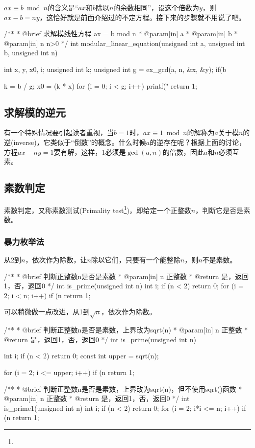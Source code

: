 $ax \equiv b\bmod n$的含义是“$ax$和$b$除以$n$的余数相同”，设这个倍数为$y$，则$ax-b=ny$，这恰好就是前面介绍过的不定方程。接下来的步骤就不用说了吧。

\begin{Code}
/**
 * @brief 求解模线性方程 ax = b mod n
 * @param[in] a
 * @param[in] b
 * @param[in] n n>0
 */
int modular_linear_equation(unsigned int a, unsigned int b, unsigned int n) {
    int x, y, x0, i;
    unsigned int k;
    unsigned int g = ex_gcd(a, n, &x, &y);
    if(b %

    k = b / g;
    x0 = (k * x) %
    for (i = 0; i < g; i++)
        printf("%
    return 1;
}
\end{Code}


\subsection{求解模的逆元}
有一个特殊情况要引起读者重视，当$b=1$时，$ax \equiv 1\bmod n$的解称为$a$关于模$n$的逆(inverse)，它类似于“倒数”的概念。什么时候$a$的逆存在呢？根据上面的讨论，方程$ax-ny=1$要有解，这样，1必须是$\gcd(a,n)$的倍数，因此$a$和$n$必须互素。

\subsection{素数判定}
素数判定，又称素数测试(Primality test\footnote{})，即给定一个正整数$n$，判断它是否是素数。

\subsubsection{暴力枚举法}
从2到$n$，依次作为除数，让$n$除以它们，只要有一个能整除$n$，则$n$不是素数。

\begin{Code}
/**
 * @brief 判断正整数n是否是素数
 * @param[in] n 正整数
 * @return 是，返回1，否，返回0
 */
int is_prime(unsigned int n) {
    int i;
    if (n < 2) return 0;
    for (i = 2; i < n; i++) {
        if (n %
    }
    return 1;
}
\end{Code}

可以稍微做一点改进，从1到$\sqrt n$，依次作为除数。

\begin{Code}
/**
 * @brief 判断正整数n是否是素数，上界改为sqrt(n)
 * @param[in] n 正整数
 * @return 是，返回1，否，返回0
 */
int is_prime(unsigned int n) {
    int i;
    if (n < 2) return 0;
    const int upper = sqrt(n);

    for (i = 2; i <= upper; i++) {
        if (n %
    }
    return 1;
}

/**
 * @brief 判断正整数n是否是素数，上界改为sqrt(n)，但不使用sqrt()函数
 * @param[in] n 正整数
 * @return 是，返回1，否，返回0
 */
int is_prime1(unsigned int n) {
    int i;
    if (n < 2) return 0;
    for (i = 2; i*i <= n; i++) {
        if (n %
    }
    return 1;
}
\end{Code}

